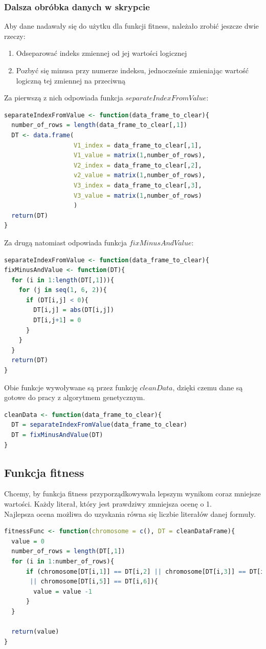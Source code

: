 \documentclass[11pt]{article}
\theoremstyle{note}
\begin{document}
\subsubsection{Dalsza obróbka danych w skrypcie}
Aby dane nadawały się do użytku dla funkcji fitness, należało zrobić jeszcze dwie rzeczy:
\begin{enumerate}
\item Odseparować indeks zmiennej od jej wartości logicznej 
\item Pozbyć się minusa przy numerze indeksu, jednocześnie zmieniając wartość logiczną tej zmiennej na przeciwną
\end{enumerate}
Za pierwszą z nich odpowiada funkcja $separateIndexFromValue$:
\begin{lstlisting}[language=R]
separateIndexFromValue <- function(data_frame_to_clear){
  number_of_rows = length(data_frame_to_clear[,1])
  DT <- data.frame(
                   V1_index = data_frame_to_clear[,1],
                   V1_value = matrix(1,number_of_rows),
                   V2_index = data_frame_to_clear[,2],
                   v2_value = matrix(1,number_of_rows),
                   V3_index = data_frame_to_clear[,3],
                   V3_value = matrix(1,number_of_rows)
                   )
  return(DT)
}
\end{lstlisting}
\newpage
\noindent
Za drugą natomiast odpowiada funkcja $fixMinusAndValue$:
\begin{lstlisting}[language=R]
separateIndexFromValue <- function(data_frame_to_clear){
fixMinusAndValue <- function(DT){
  for (i in 1:length(DT[,1])){
    for (j in seq(1, 6, 2)){
      if (DT[i,j] < 0){ 
        DT[i,j] = abs(DT[i,j])
        DT[i,j+1] = 0 
      }   
    }   
  }
  return(DT)
}
\end{lstlisting}
Obie funkcje wywoływane są przez funkcję $cleanData$, dzięki czemu dane są gotowe do pracy z algorytmem genetycznym.
\begin{lstlisting}[language=R]
cleanData <- function(data_frame_to_clear){
  DT = separateIndexFromValue(data_frame_to_clear)
  DT = fixMinusAndValue(DT)
}
\end{lstlisting}
\subsection{Funkcja fitness}
Chcemy, by funkcja fitness przyporządkowywała lepszym wynikom coraz mniejsze wartości. 
Każdy literał, który jest prawdziwy zmniejsza ocenę o 1. \\
Najlepsza ocena możliwa do uzyskania równa się liczbie literałów danej formuły.
\begin{lstlisting}[language=R]
fitnessFunc <- function(chromosome = c(), DT = cleanDataFrame){
  value = 0 
  number_of_rows = length(DT[,1])
  for (i in 1:number_of_rows){
      if (chromosome[DT[i,1]] == DT[i,2] || chromosome[DT[i,3]] == DT[i,4] 
       || chromosome[DT[i,5]] == DT[i,6]){
        value = value -1
      }   
  }

  return(value)
}
\end{lstlisting}
\end{document}
